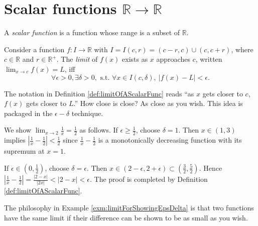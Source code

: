 \section{Scalar functions
  $\mathbb{R}\rightarrow\mathbb{R}$}
\label{sec:cont-funct-on-R}

\begin{defn}
  A \emph{scalar function} is a function
   whose range is a subset of $\mathbb{R}$.
\end{defn}

\begin{defn}
  \label{def:limitOfAScalarFunc}
  Consider a function $f: I\rightarrow \mathbb{R}$
  with $I=I(c,r)=(c-r,c)\cup (c,c+r)$, where $c\in \mathbb{R}$
  and $r\in \mathbb{R}^{+}$.
  The \emph{limit} of $f(x)$  exists
   as $x$ approaches $c$, written
     $\lim_{x\rightarrow c} f(x) = L$,
  iff 
  \begin{equation}
 \forall \epsilon>0, \exists \delta>0, \text{ s.t. }
    \forall x\in I(c,\delta),\ |f(x)-L|<\epsilon.
  \end{equation}
\end{defn}

\begin{rem}
  The notation in Definition \ref{def:limitOfAScalarFunc}
  reads ``as $x$ gets closer to $c$,
 $f(x)$ gets closer to $L$.''
How close is close?
As close as you wish.
This idea is packaged in the $\epsilon-\delta$ technique.
\end{rem}

\begin{exm}
  \label{exm:limitForShowingEpsDelta}
   We show $\lim_{x\rightarrow 2}\frac{1}{x}= \frac{1}{2}$ as follows.
   If $\epsilon\ge \frac{1}{2}$,
   choose $\delta=1$.
   Then $x\in(1,3)$ implies
   $\left|\frac{1}{x}-\frac{1}{2}\right|<\frac{1}{2}$
   since $\frac{1}{x}-\frac{1}{2}$
   is a monotonically decreasing function
   with its supremum at $x=1$.

  If $\epsilon\in (0,\frac{1}{2})$,
   choose $\delta=\epsilon$.
  Then $x\in (2-\epsilon,2+\epsilon)\subset
  (\frac{3}{2},\frac{5}{2})$.
  Hence
  $\left|\frac{1}{x}-\frac{1}{2}\right|=\frac{|2-x|}{|2x|}<|2-x|<\epsilon$.
  The proof is completed by Definition \ref{def:limitOfAScalarFunc}.
\end{exm}

\begin{rem}
  The philosophy in Example \ref{exm:limitForShowingEpsDelta}
  is that two functions have the same limit
  if their difference can be shown to be as small as you wish.
\end{rem}

